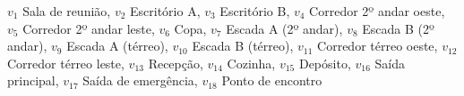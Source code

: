 $v_{1}$ Sala de reunião, $v_{2}$ Escritório A, $v_{3}$ Escritório B, $v_{4}$ Corredor 2º andar oeste, $v_{5}$ Corredor 2º andar leste, $v_{6}$ Copa, $v_{7}$ Escada A (2º andar), $v_{8}$ Escada B (2º andar), $v_{9}$ Escada A (térreo), $v_{10}$ Escada B (térreo), $v_{11}$ Corredor térreo oeste, $v_{12}$ Corredor térreo leste, $v_{13}$ Recepção, $v_{14}$ Cozinha, $v_{15}$ Depósito, $v_{16}$ Saída principal, $v_{17}$ Saída de emergência, $v_{18}$ Ponto de encontro
